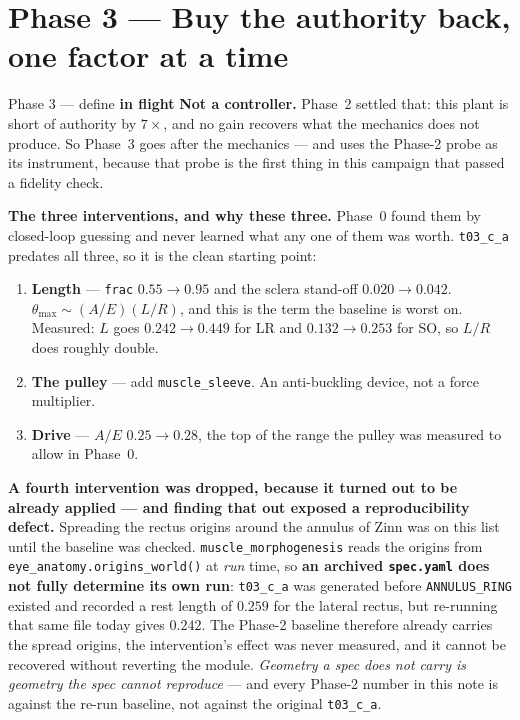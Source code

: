 \documentclass[11pt,a4paper]{article}
\newcommand{\code}[1]{\texttt{#1}}
\newcommand{\fl}{\textcolor{warn}{\textbf{in flight}}}
\begin{document}
\section{Phase 3 --- Buy the authority back, one factor at a time}

\begin{phasebox}{Phase 3 --- define \hfill \fl}
\textbf{Not a controller.} Phase~2 settled that: this plant is short of authority by $7\times$, and
no gain recovers what the mechanics does not produce. So Phase~3 goes after the mechanics --- and
uses the Phase-2 probe as its instrument, because that probe is the first thing in this campaign
that passed a fidelity check.

\textbf{The three interventions, and why these three.} Phase~0 found them by closed-loop guessing
and never learned what any one of them was worth. \code{t03\_c\_a} predates all three, so it is the
clean starting point:

\begin{enumerate}
\item \textbf{Length} --- \code{frac} $0.55\to0.95$ and the sclera stand-off $0.020\to0.042$.
$\theta_{\max}\sim(A/E)(L/R)$, and this is the term the baseline is worst on. Measured: $L$ goes
$0.242\to0.449$ for LR and $0.132\to0.253$ for SO, so $L/R$ does roughly double.
\item \textbf{The pulley} --- add \code{muscle\_sleeve}. An anti-buckling device, not a force
multiplier.
\item \textbf{Drive} --- $A/E$ $0.25\to0.28$, the top of the range the pulley was measured to allow
in Phase~0.
\end{enumerate}

\begin{tcolorbox}[colback=bad!4,colframe=bad!45,boxrule=0.7pt,arc=2pt]
\textbf{A fourth intervention was dropped, because it turned out to be already applied --- and
finding that out exposed a reproducibility defect.} Spreading the rectus origins around the annulus
of Zinn was on this list until the baseline was checked. \code{muscle\_morphogenesis} reads the
origins from \code{eye\_anatomy.origins\_world()} at \emph{run} time, so
\textbf{an archived \code{spec.yaml} does not fully determine its own run}: \code{t03\_c\_a} was
generated before \code{ANNULUS\_RING} existed and recorded a rest length of $0.259$ for the lateral
rectus, but re-running that same file today gives $0.242$. The Phase-2 baseline therefore already
carries the spread origins, the intervention's effect was never measured, and it cannot be recovered
without reverting the module. \emph{Geometry a spec does not carry is geometry the spec cannot
reproduce} --- and every Phase-2 number in this note is against the re-run baseline, not against the
original \code{t03\_c\_a}.
\end{tcolorbox}


\end{phasebox}
\end{document}
